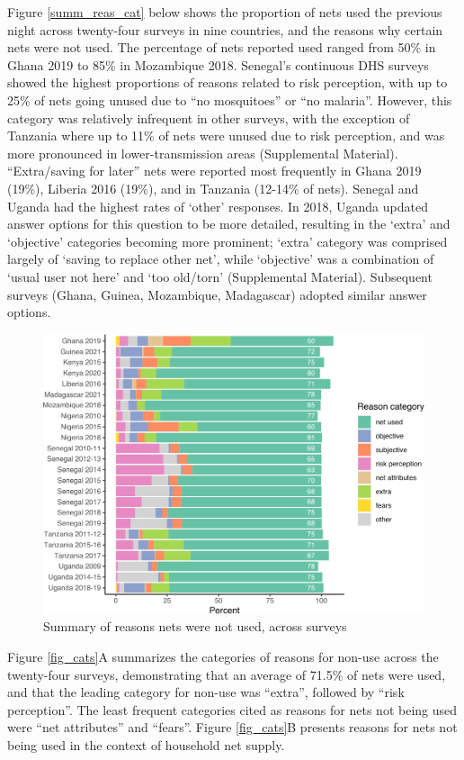 \documentclass[review,
3p]{elsarticle} %
\begin{document}
Figure \ref{summ_reas_cat} below shows the proportion of nets used the
previous night across twenty-four surveys in nine countries, and the
reasons why certain nets were not used. The percentage of nets reported
used ranged from 50\% in Ghana 2019 to 85\% in Mozambique 2018.
Senegal's continuous DHS surveys showed the highest proportions of
reasons related to risk perception, with up to 25\% of nets going unused
due to ``no mosquitoes'' or ``no malaria''. However, this category was
relatively infrequent in other surveys, with the exception of Tanzania
where up to 11\% of nets were unused due to risk perception, and was
more pronounced in lower-transmission areas (Supplemental Material).
``Extra/saving for later'' nets were reported most frequently in Ghana
2019 (19\%), Liberia 2016 (19\%), and in Tanzania (12-14\% of nets).
Senegal and Uganda had the highest rates of `other' responses. In 2018,
Uganda updated answer options for this question to be more detailed,
resulting in the `extra' and `objective' categories becoming more
prominent; `extra' category was comprised largely of `saving to replace
other net', while `objective' was a combination of `usual user not here'
and `too old/torn' (Supplemental Material). Subsequent surveys (Ghana,
Guinea, Mozambique, Madagascar) adopted similar answer options.

\begin{figure}

{\centering \includegraphics[width=0.8\linewidth]{reasons_paper_files/figure-latex/summ_reas_cat-1} 

}

\caption{\label{summ_reas_cat}Summary of reasons nets were not used, across surveys}\label{fig:summ_reas_cat}
\end{figure}

Figure \ref{fig_cats}A summarizes the categories of reasons for non-use
across the twenty-four surveys, demonstrating that an average of 71.5\%
of nets were used, and that the leading category for non-use was
``extra'', followed by ``risk perception''. The least frequent
categories cited as reasons for nets not being used were ``net
attributes'' and ``fears''. Figure \ref{fig_cats}B presents reasons for
nets not being used in the context of household net supply.
\end{document}
